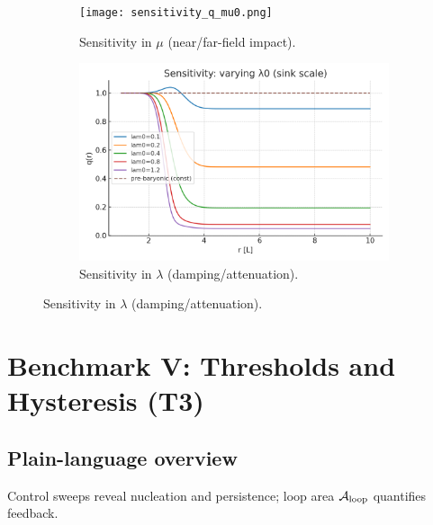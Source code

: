 \documentclass[12pt,a4paper,oneside]{scrreprt}
\begin{document}
\begin{figure}[htbp]\centering
  \begin{subfigure}[t]{0.49\linewidth}
    \texttt{[image: sensitivity\_q\_mu0.png]}
    \caption{Sensitivity in $\mu$ (near/far-field impact).}
    \label{fig:sens:mu}
  \end{subfigure}\hfill
  \begin{subfigure}[t]{0.49\linewidth}
    \includegraphics[width=\linewidth]{sensitivity_q_lam0.png}
    \caption{Sensitivity in $\lambda$ (damping/attenuation).}
    \label{fig:sens:lam}
  \end{subfigure}
\end{figure}

\chapter{Benchmark V: Thresholds and Hysteresis (T3)}
\section*{Plain-language overview}
Control sweeps reveal nucleation and persistence; loop area $\mathcal A_{\rm loop}$ quantifies feedback.
\end{document}

